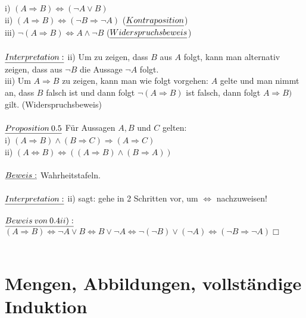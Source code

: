 \documentclass[fleqn, a4paper, 11pt]{article}
\begin{document}
i) $(A\Rightarrow B)\Leftrightarrow (\neg A\vee B)$\\
ii) $(A\Rightarrow B) \Leftrightarrow (\neg B \Rightarrow \neg A)$ ($\uline{Kontraposition}$) \\
iii) $\neg(A\Rightarrow B) \Leftrightarrow A\wedge\neg B$ ($\uline{Widerspruchsbeweis}$) \\
\\
$\uline{Interpretation:}$ ii) Um zu zeigen, dass $B$ aus $A$ folgt, kann man alternativ zeigen, dass aus $\neg B$ die Aussage $\neg A$ folgt.\\
iii) Um $A\Rightarrow B$ zu zeigen, kann man wie folgt vorgehen: $A$ gelte und man nimmt an, dass $B$ falsch ist und dann folgt $\neg(A\Rightarrow B)$ ist falsch, dann folgt $A\Rightarrow B)$ gilt. (Widerspruchsbeweis)\\
\\
$\uline{Proposition\:0.5}$ F\"ur Aussagen $A,B$ und $C$ gelten:\\
i) $(A\Rightarrow B)\wedge(B\Rightarrow C)\Rightarrow(A\Rightarrow C)$ \\
ii) $(A\Leftrightarrow B)\Leftrightarrow((A\Rightarrow B)\wedge(B\Rightarrow A))$\\
\\
$\uline{Beweis:}$ Wahrheitstafeln.\\
\\
$\uline{Interpretation:}$ ii) sagt: gehe in 2 Schritten vor, um $\Leftrightarrow$ nachzuweisen!\\
\\
$\uline{Beweis\:von\:0.4ii):}$ $(A\Rightarrow B) \Leftrightarrow \neg A\vee B \Leftrightarrow B\vee\neg A \Leftrightarrow \neg(\neg B)\vee(\neg A) \Leftrightarrow (\neg B \Rightarrow \neg A)$\hfill $\Box$\\
\\
\newpage
\section{Mengen, Abbildungen, vollst\"andige Induktion}
\end{document}
